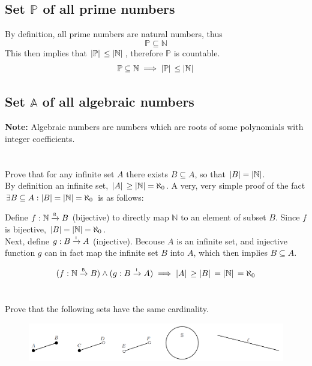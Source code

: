 \documentclass[]{article}
\newcommand{\N}{\mathbb{N}}
\newcommand{\toI}{\xrightarrow{\textsf{\tiny I}}}
\newcommand{\toB}{\xrightarrow{\textsf{\tiny B}}}
\begin{document}
\subsection{Set $\mathbb{P}$ of all prime numbers}
By definition, all prime numbers are natural numbers, thus
\begin{displaymath}
	\mathbb{P} \subseteq \N
\end{displaymath}
This then implies that $\abs*{\mathbb{P}} \leq \abs*{\N}$, therefore $\mathbb{P}$ is countable.
\begin{displaymath}
	\mathbb{P} \subseteq \N \implies \abs*{\mathbb{P}} \leq \abs*{\N}
\end{displaymath}


\subsection{Set $\mathbb{A}$ of all algebraic numbers}
\textbf{Note:} Algebraic numbers are numbers which are roots of 
some polynomials with integer coefficients.









\newpage
\section{}
Prove that for any infinite set $A$ there exists $B \subseteq A$, so that $\abs{B}=\abs{\N}$.\\

By definition an infinite set, $\abs*{A} \geq \abs{\N} = \aleph_0$.
A very, very simple proof of the fact $\exists B \subseteq A : \abs{B}=\abs{\N} = \aleph_0$ 
is as follows:

Define $f : \N \toB B$ (bijective) to directly map $\N$ to an element of subset $B$. 
Since $f$ is bijective, $\abs{B}=\abs{\N} = \aleph_0$.\\
Next, define $g : B \toI A$ (injective). Becouse $A$ is an infinite set, 
and injective function $g$ can in fact map the infinite set $B$ into $A$, 
which then implies $B \subseteq A$.

\begin{displaymath}
	(f : \N \toB B) \land (g : B \toI A) \implies \abs*{A} \geq \abs*{B} = \abs*{\N} = \aleph_0
\end{displaymath}


\newpage
\section{}
Prove that the following sets have the same cardinality.
\begin{figure}[h]
	\centering
	\includegraphics[width=\textwidth]{fig/pblm6.png}
\end{figure}
\end{document}
